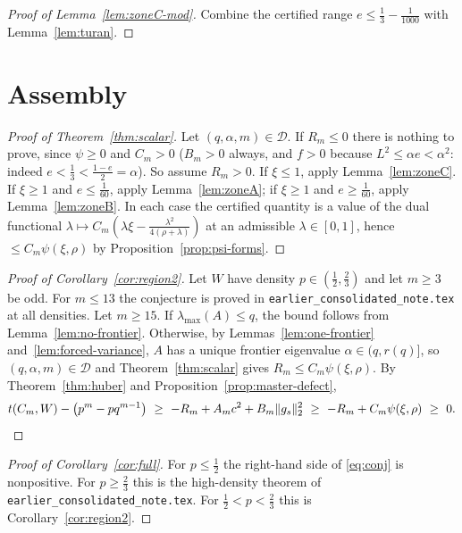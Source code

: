 \documentclass[11pt]{article}
\begin{document}
\begin{proof}[Proof of Lemma~\ref{lem:zoneC-mod}]
Combine the certified range $e\le\tfrac13-\tfrac1{1000}$ with
Lemma~\ref{lem:turan}.
\end{proof}

\section{Assembly}\label{sec:assembly}

\begin{proof}[Proof of Theorem~\ref{thm:scalar}]
Let $(q,\alpha,m)\in\mathcal D$.  If $R_m\le0$ there is nothing to prove, since
$\psi\ge0$ and $C_m>0$ ($B_m>0$ always, and $f>0$ because
$L^2\le\alpha e<\alpha^2$: indeed $e<\tfrac13<\tfrac{1-e}2=\alpha$).
So assume $R_m>0$.  If $\xi\le1$, apply
Lemma~\ref{lem:zoneC}.  If $\xi\ge1$ and $e\le\tfrac1{60}$, apply
Lemma~\ref{lem:zoneA}; if $\xi\ge1$ and $e\ge\tfrac1{60}$, apply
Lemma~\ref{lem:zoneB}.  In each case the certified quantity is a value of the
dual functional $\lambda\mapsto C_m(\lambda\xi-\frac{\lambda^2}{4(\rho+\lambda)})$
at an admissible $\lambda\in[0,1]$, hence $\le C_m\psi(\xi,\rho)$ by
Proposition~\ref{prop:psi-forms}.
\end{proof}

\begin{proof}[Proof of Corollary~\ref{cor:region2}]
Let $W$ have density $p\in(\tfrac12,\tfrac23)$ and let $m\ge3$ be odd.  For
$m\le13$ the conjecture is proved in \texttt{earlier\_consolidated\_note.tex} at all densities.
Let $m\ge15$.  If $\lambda_{\max}(A)\le q$, the bound follows from
Lemma~\ref{lem:no-frontier}.
Otherwise, by Lemmas~\ref{lem:one-frontier} and~\ref{lem:forced-variance}, $A$
has a unique frontier eigenvalue $\alpha\in(q,r(q)]$, so $(q,\alpha,m)\in\mathcal D$
and Theorem~\ref{thm:scalar} gives $R_m\le C_m\psi(\xi,\rho)$.  By
Theorem~\ref{thm:huber} and Proposition~\ref{prop:master-defect},
\[
        t(C_m,W)-\bigl(p^m-pq^{m-1}\bigr)
        \ \ge\ -R_m+A_mc^2+B_m\|g_s\|_2^2
        \ \ge\ -R_m+C_m\psi(\xi,\rho)\ \ge\ 0. \qedhere
\]
\end{proof}

\begin{proof}[Proof of Corollary~\ref{cor:full}]
For $p\le\tfrac12$ the right-hand side of \eqref{eq:conj} is nonpositive.  For
$p\ge\tfrac23$ this is the high-density theorem of \texttt{earlier\_consolidated\_note.tex}.
For $\tfrac12<p<\tfrac23$ this is Corollary~\ref{cor:region2}.
\end{proof}
\end{document}
